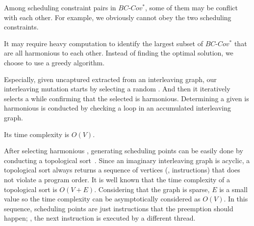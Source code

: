 %
Among scheduling constraint pairs in $BC\mbox{-}Cov^*$, some of them
may be conflict with each other.
%
For example, 
we obviously cannot obey the two scheduling constraints.



It may require heavy computation to identify the largest subset of
$BC\mbox{-}Cov^*$ that are all harmonious to each other.
%
Instead of finding the optimal solution, we choose to use a greedy
algorithm.
%


Especially, given uncaptured \segments extracted from an interleaving
graph, our interleaving mutation starts by selecting a random
\segment.
%
And then it iteratively selects a \segment while confirming that the
selected \segment is harmonious.
%
Determining a given \segment is harmonious is conducted by checking a
loop in an accumulated interleaving graph.

Its time complexity is $O(V)$.


%
After selecting harmonious \segments, generating scheduling points can
be easily done by conducting a topological
sort~\cite{topologicalsort}.
%
Since an imaginary interleaving graph is acyclic, a topological sort
always returns a sequence of vertices (\ie, instructions) that does
not violate a program order.
%
It is well known that the time complexity of a topological sort is
$O(V+E)$. Considering that the graph is sparse, $E$ is a small value
so the time complexity can be asymptotically considered as $O(V)$.
%
In this sequence, scheduling points are just instructions that the
preemption should happen; \ie, the next instruction is executed by a
different thread.
%





